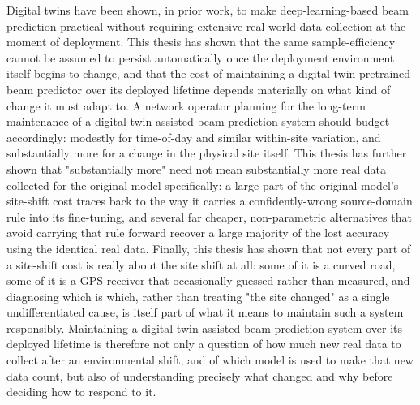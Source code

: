 \documentclass{iutbscthesis}
\begin{document}
Digital twins have been shown, in prior work, to make deep-learning-based beam prediction practical without requiring extensive real-world data collection at the moment of deployment. This thesis has shown that the same sample-efficiency cannot be assumed to persist automatically once the deployment environment itself begins to change, and that the cost of maintaining a digital-twin-pretrained beam predictor over its deployed lifetime depends materially on what kind of change it must adapt to. A network operator planning for the long-term maintenance of a digital-twin-assisted beam prediction system should budget accordingly: modestly for time-of-day and similar within-site variation, and substantially more for a change in the physical site itself. This thesis has further shown that "substantially more" need not mean substantially more real data collected for the original model specifically: a large part of the original model's site-shift cost traces back to the way it carries a confidently-wrong source-domain rule into its fine-tuning, and several far cheaper, non-parametric alternatives that avoid carrying that rule forward recover a large majority of the lost accuracy using the identical real data. Finally, this thesis has shown that not every part of a site-shift cost is really about the site shift at all: some of it is a curved road, some of it is a GPS receiver that occasionally guessed rather than measured, and diagnosing which is which, rather than treating "the site changed" as a single undifferentiated cause, is itself part of what it means to maintain such a system responsibly. Maintaining a digital-twin-assisted beam prediction system over its deployed lifetime is therefore not only a question of how much new real data to collect after an environmental shift, and of which model is used to make that new data count, but also of understanding precisely what changed and why before deciding how to respond to it.


\printbib
\end{document}
